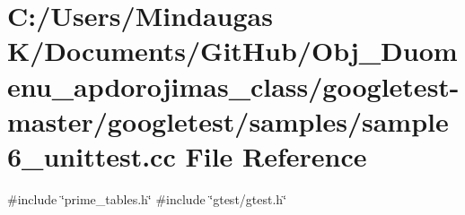 \hypertarget{googletest-master_2googletest_2samples_2sample6__unittest_8cc}{}\section{C\+:/\+Users/\+Mindaugas K/\+Documents/\+Git\+Hub/\+Obj\+\_\+\+Duomenu\+\_\+apdorojimas\+\_\+class/googletest-\/master/googletest/samples/sample6\+\_\+unittest.cc File Reference}
\label{googletest-master_2googletest_2samples_2sample6__unittest_8cc}
{\ttfamily \#include \char`\"{}prime\+\_\+tables.\+h\char`\"{}}\newline
{\ttfamily \#include \char`\"{}gtest/gtest.\+h\char`\"{}}\newline
